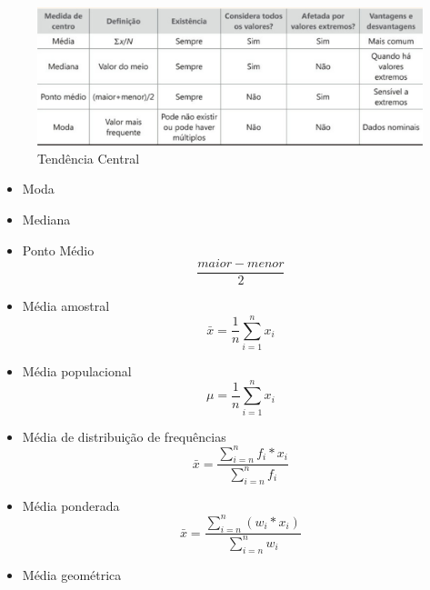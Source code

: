 \begin{figure}[!htp]
    \centering
    \includegraphics[scale=.4]{../img/estatistica/tendencia-central.png}
    \caption{Tendência Central}
    \label{img:tendencia_central}
\end{figure}

\begin{itemize}
    \item Moda
    \item Mediana
    \item Ponto Médio
          \begin{equation} \label{eq:ponto_medio}
              \frac{maior - menor}{2}
          \end{equation}
    \item Média amostral
          \begin{equation} \label{eq:media_amostral}
              \bar{x} = \frac{1}{n} \sum^{n}_{i=1} x_i
          \end{equation}
    \item Média populacional
          \begin{equation} \label{eq:media_populacional}
              \mu = \frac{1}{n} \sum^{n}_{i=1} x_i
          \end{equation}
    \item Média de distribuição de frequências
          \begin{equation} \label{eq:media_distribuicao_frequencia}
              \bar{x} = \frac{\sum^{n}_{i=n} f_i * x_i} {\sum^{n}_{i=n} f_i}
          \end{equation}
    \item Média ponderada
          \begin{equation} \label{eq:media_ponderada}
              \bar{x} =
              \frac{\sum^{n}_{i=n} (w_i * x_i)}
              {\sum^{n}_{i=n} w_i}
          \end{equation}
    \item Média geométrica
          \begin{equation} \label{eq:media_geometrica}

\end{equation}
\end{itemize}
